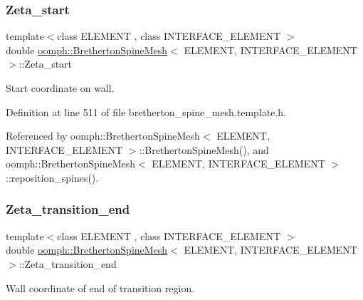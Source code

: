 \subsubsection{\texorpdfstring{Zeta\+\_\+start}{Zeta\_start}}
{\footnotesize\ttfamily template$<$class E\+L\+E\+M\+E\+NT , class I\+N\+T\+E\+R\+F\+A\+C\+E\+\_\+\+E\+L\+E\+M\+E\+NT $>$ \\
double \hyperlink{classoomph_1_1BrethertonSpineMesh}{oomph\+::\+Bretherton\+Spine\+Mesh}$<$ E\+L\+E\+M\+E\+NT, I\+N\+T\+E\+R\+F\+A\+C\+E\+\_\+\+E\+L\+E\+M\+E\+NT $>$\+::Zeta\+\_\+start\hspace{0.3cm}{\ttfamily [protected]}}



Start coordinate on wall. 



Definition at line 511 of file bretherton\+\_\+spine\+\_\+mesh.\+template.\+h.



Referenced by oomph\+::\+Bretherton\+Spine\+Mesh$<$ E\+L\+E\+M\+E\+N\+T, I\+N\+T\+E\+R\+F\+A\+C\+E\+\_\+\+E\+L\+E\+M\+E\+N\+T $>$\+::\+Bretherton\+Spine\+Mesh(), and oomph\+::\+Bretherton\+Spine\+Mesh$<$ E\+L\+E\+M\+E\+N\+T, I\+N\+T\+E\+R\+F\+A\+C\+E\+\_\+\+E\+L\+E\+M\+E\+N\+T $>$\+::reposition\+\_\+spines().

\mbox{\label{classoomph_1_1BrethertonSpineMesh_a1d05bb741eba54ab7498ab4f3c55f1b7}} 
\subsubsection{\texorpdfstring{Zeta\+\_\+transition\+\_\+end}{Zeta\_transition\_end}}
{\footnotesize\ttfamily template$<$class E\+L\+E\+M\+E\+NT , class I\+N\+T\+E\+R\+F\+A\+C\+E\+\_\+\+E\+L\+E\+M\+E\+NT $>$ \\
double \hyperlink{classoomph_1_1BrethertonSpineMesh}{oomph\+::\+Bretherton\+Spine\+Mesh}$<$ E\+L\+E\+M\+E\+NT, I\+N\+T\+E\+R\+F\+A\+C\+E\+\_\+\+E\+L\+E\+M\+E\+NT $>$\+::Zeta\+\_\+transition\+\_\+end\hspace{0.3cm}{\ttfamily [protected]}}



Wall coordinate of end of transition region. 



